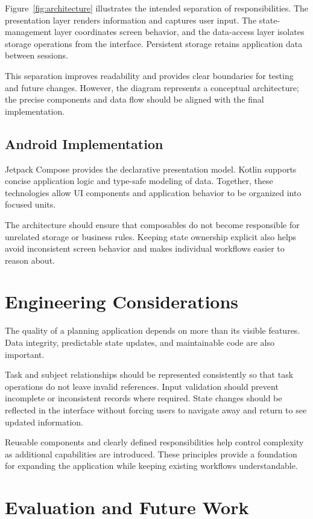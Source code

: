 \documentclass[10pt,a4paper,twocolumn]{article}
\begin{document}
Figure~\ref{fig:architecture} illustrates the intended separation of
responsibilities. The presentation layer renders information and
captures user input. The state-management layer coordinates screen
behavior, and the data-access layer isolates storage operations from
the interface. Persistent storage retains application data between
sessions.

This separation improves readability and provides clear boundaries
for testing and future changes. However, the diagram represents a
conceptual architecture; the precise components and data flow should
be aligned with the final implementation.

\subsection{Android Implementation}

Jetpack Compose provides the declarative presentation model. Kotlin
supports concise application logic and type-safe modeling of data.
Together, these technologies allow UI components and application
behavior to be organized into focused units.

The architecture should ensure that composables do not become
responsible for unrelated storage or business rules. Keeping state
ownership explicit also helps avoid inconsistent screen behavior and
makes individual workflows easier to reason about.

\section{Engineering Considerations}

The quality of a planning application depends on more than its visible
features. Data integrity, predictable state updates, and maintainable
code are also important.

Task and subject relationships should be represented consistently so
that task operations do not leave invalid references. Input validation
should prevent incomplete or inconsistent records where required.
State changes should be reflected in the interface without forcing
users to navigate away and return to see updated information.

Reusable components and clearly defined responsibilities help control
complexity as additional capabilities are introduced. These principles
provide a foundation for expanding the application while keeping
existing workflows understandable.

\section{Evaluation and Future Work}
\end{document}
